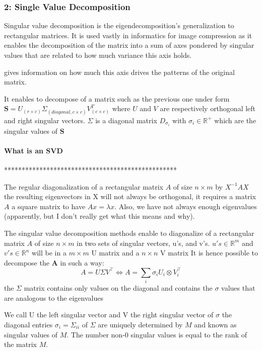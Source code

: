 \documentclass{article}
\begin{document}
\subsubsection{2: Single Value Decomposition}

Singular value decomposition is the eigendecomposition's generalization to rectangular matrices. It is used vastly in informatics for image compression as it enables the decomposition of the matrix into a sum of axes pondered by singular values that are related to how much variance this  axis holds.

gives information on how much this axis drives the patterns of the original matrix.

It enables to decompose of a matrix such as the previous one under form  $\textbf{S} = U_{(r\times c)} \Sigma_{(diagonal, c\times c)} V_{(c \times c)}^T$ where $U$ and $V$ are respectively orthogonal left and right singular vectors. $\Sigma$ is a diagonal matrix $D_{\sigma_i}$ with $\sigma_i \in \mathbb{R}^+$ which are the singular values of $\textbf{S}$

\paragraph{What is an SVD}




*************************************************

The regular diagonalization of a rectangular matrix $A$ of size $n \times m$ by $X^{-1} AX$ the resulting eigenvectors in X will not always be orthogonal, it requires a matrix $A$ a square matrix to have $Ax = \lambda x$. Also, we have not always enough eigenvalues (apparently, but I don't really get what this means and why).

The singular value decomposition methods enable to diagonalize of a rectangular matrix $A$ of size $n \times m$ in two sets of singular vectors, u's, and v's. 
$u's \in \mathbb{R}^m$ and $v's \in \mathbb{R}^n$ will be in a $m \times m$ U matrix and a $n \times n$ V matrix
It is hence possible to decompose the $\textbf{A}$ in such a way:
$$A = U \Sigma V^\intercal \Leftrightarrow A = \sum_i \sigma_i U_i \otimes V_i^\intercal$$
the  $\Sigma$ matrix contains only values on the diagonal and contains the $\sigma$ values that are analogous to the eigenvalues 

We call U the left singular vector and V the right singular vector of $\sigma$
the diagonal entries $\sigma_i = \Sigma_{ii}$ of $\Sigma$ are uniquely determined by $M$ and known as singular values of $M$. The number non-0 singular values is equal to the rank of the matrix $M$.
\end{document}
